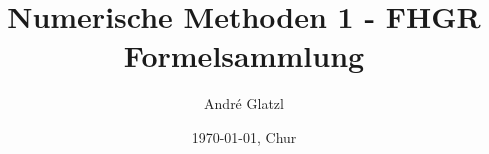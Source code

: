 \documentclass[11pt]{article}
\title{Numerische Methoden 1 - FHGR Formelsammlung}
\author{André Glatzl}
\date{\today{}, Chur}
\begin{document}
\scriptsize




\end{document}
